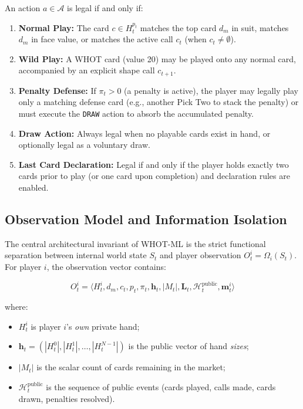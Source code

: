 \documentclass[11pt]{article}
\begin{document}
An action $a \in \mathcal{A}$ is legal if and only if:
\begin{enumerate}
  \item \textbf{Normal Play:} The card $c \in H_t^{p_t}$ matches the top card $d_m$ in suit, matches $d_m$ in face value, or matches the active call $c_t$ (when $c_t \neq \emptyset$).
  \item \textbf{Wild Play:} A WHOT card (value 20) may be played onto any normal card, accompanied by an explicit shape call $c_{t+1}$.
  \item \textbf{Penalty Defense:} If $\pi_t > 0$ (a penalty is active), the player may legally play only a matching defense card (e.g., another Pick Two to stack the penalty) or must execute the \texttt{DRAW} action to absorb the accumulated penalty.
  \item \textbf{Draw Action:} Always legal when no playable cards exist in hand, or optionally legal as a voluntary draw.
  \item \textbf{Last Card Declaration:} Legal if and only if the player holds exactly two cards prior to play (or one card upon completion) and declaration rules are enabled.
\end{enumerate}

\subsection{Observation Model and Information Isolation}
The central architectural invariant of WHOT-ML is the strict functional separation between internal world state $S_t$ and player observation $O_t^i = \Omega_i(S_t)$. For player $i$, the observation vector contains:

\[
O_t^i = \langle H_t^i, d_m, c_t, p_t, \pi_t, \mathbf{h}_t, |M_t|, \mathbf{L}_t, \mathcal{H}_t^{\text{public}}, \mathbf{m}_t^i \rangle
\]

where:
\begin{itemize}
  \item $H_t^i$ is player $i$'s \textit{own} private hand;
  \item $\mathbf{h}_t = (|H_t^0|, |H_t^1|, \dots, |H_t^{N-1}|)$ is the public vector of hand \textit{sizes};
  \item $|M_t|$ is the scalar count of cards remaining in the market;
  \item $\mathcal{H}_t^{\text{public}}$ is the sequence of public events (cards played, calls made, cards drawn, penalties resolved).
\end{itemize}
\end{document}
